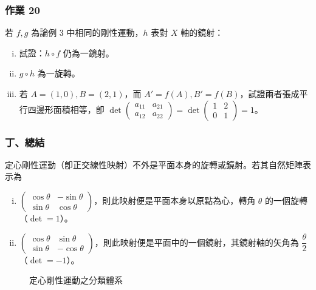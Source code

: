 \subsubsection*{作業 20}
若 $f, g$ 為論例 3 中相同的剛性運動，$h$ 表對 $X$ 軸的鏡射：
\begin{enumerate}[(i)]
  \item 試證：$h \circ f$ 仍為一鏡射。
  \item $g \circ h$ 為一旋轉。
  \item 若 $A = (1, 0), B = (2, 1)$，而 $A' = f(A), B' = f(B)$，試證兩者張成平行四邊形面積相等，卽 $\det\begin{pmatrix} a_{11} & a_{21} \\ a_{12} & a_{22} \end{pmatrix} = \det\begin{pmatrix} 1 & 2 \\ 0 & 1 \end{pmatrix} = 1$。
\end{enumerate}

\subsubsection*{丁、總結}

\begin{theorem}[定理 7]
定心剛性運動（卽正交線性映射）不外是平面本身的旋轉或鏡射。若其自然矩陣表示為
\begin{enumerate}[(i)]
  \item $\begin{pmatrix} \cos\theta & -\sin\theta \\ \sin\theta & \cos\theta \end{pmatrix}$，則此映射便是平面本身以原點為心，轉角 $\theta$ 的一個旋轉（$\det = 1$）。
  \item $\begin{pmatrix} \cos\theta & \sin\theta \\ \sin\theta & -\cos\theta \end{pmatrix}$，則此映射便是平面中的一個鏡射，其鏡射軸的矢角為 $\dfrac{\theta}{2}$（$\det = -1$）。
\end{enumerate}
\end{theorem}

\begin{figure}[H]
\centering
{}
\caption{定心剛性運動之分類體系}
\label{fig:b4-4-6}
\end{figure}

